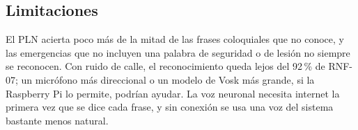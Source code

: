 \subsection{Limitaciones}

El PLN acierta poco más de la mitad de las frases coloquiales que no conoce, y las
emergencias que no incluyen una palabra de seguridad o de lesión no siempre se
reconocen. Con ruido de
calle, el reconocimiento queda lejos del 92\,\% de RNF-07; un micrófono más direccional o
un modelo de Vosk más grande, si la Raspberry Pi lo permite, podrían ayudar. La voz
neuronal necesita internet la primera vez que se dice cada frase, y sin conexión se usa
una voz del sistema bastante menos natural.
